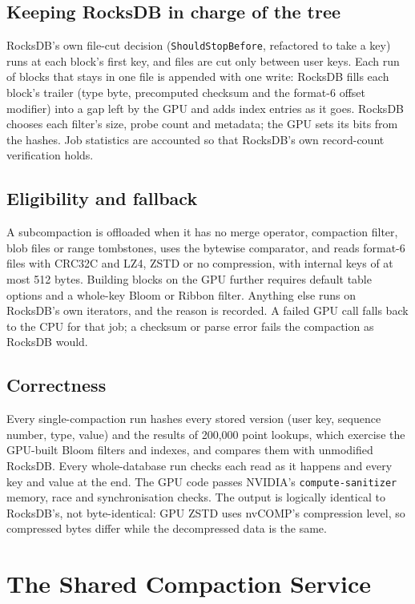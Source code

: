 \documentclass[sigconf, nonacm]{acmart}
\begin{document}
\subsection{Keeping RocksDB in charge of the tree}
RocksDB's own file-cut decision (\texttt{ShouldStopBefore}, refactored to take a key) runs at
each block's first key, and files are cut only between user keys. Each run of blocks that
stays in one file is appended with one write: RocksDB fills each block's trailer (type byte,
precomputed checksum and the format-6 offset modifier) into a gap left by the GPU and adds
index entries as it goes. RocksDB chooses each filter's size, probe count and metadata; the
GPU sets its bits from the hashes. Job statistics are accounted so that RocksDB's own
record-count verification holds.

\subsection{Eligibility and fallback}
A subcompaction is offloaded when it has no merge operator, compaction filter, blob files or
range tombstones, uses the bytewise comparator, and reads format-6 files with CRC32C and LZ4,
ZSTD or no compression, with internal keys of at most 512 bytes. Building blocks on the GPU
further requires default table options and a whole-key Bloom or Ribbon filter. Anything else
runs on RocksDB's own iterators, and the reason is recorded. A failed GPU call falls back to the
CPU for that job; a checksum or parse error fails the compaction as RocksDB would.

\subsection{Correctness}
\label{sec:correct}
Every single-compaction run hashes every stored version (user key, sequence number, type,
value) and the results of 200{,}000 point lookups, which exercise the GPU-built Bloom filters
and indexes, and compares them with unmodified RocksDB. Every whole-database run checks each
read as it happens and every key and value at the end. The GPU code passes NVIDIA's
\texttt{compute-sanitizer} memory, race and synchronisation checks. The output is logically
identical to RocksDB's, not byte-identical: GPU ZSTD uses nvCOMP's compression level, so
compressed bytes differ while the decompressed data is the same.

\section{The Shared Compaction Service}
\label{sec:service}
\end{document}
